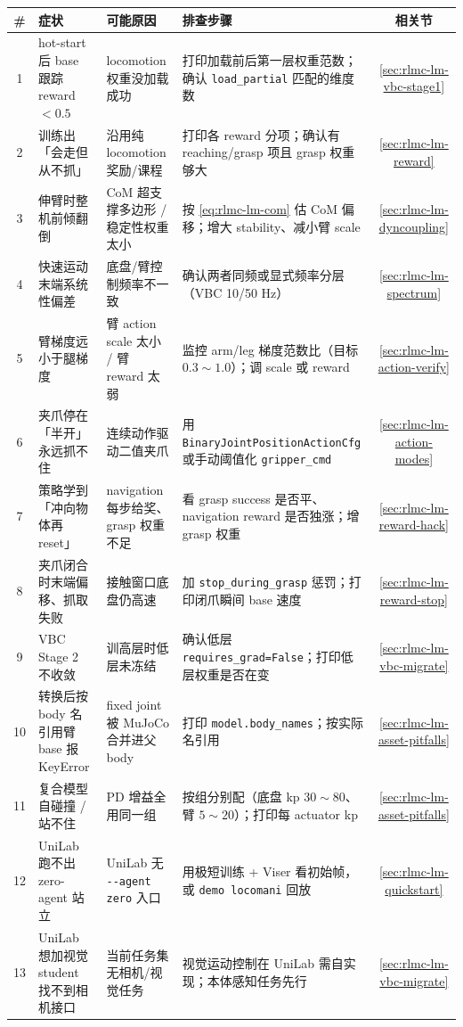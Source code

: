 \begin{center}
\small
\begin{tabular}{@{}cp{3.1cm}p{3.4cm}p{4.2cm}c@{}}
\toprule
\# & 症状 & 可能原因 & 排查步骤 & 相关节 \\
\midrule
1 & hot-start 后 base 跟踪 reward $<0.5$ & locomotion 权重没加载成功 & 打印加载前后第一层权重范数；确认 \verb|load_partial| 匹配的维度数 & \cref{sec:rlmc-lm-vbc-stage1} \\
2 & 训练出「会走但从不抓」 & 沿用纯 locomotion 奖励/课程 & 打印各 reward 分项；确认有 reaching/grasp 项且 grasp 权重够大 & \cref{sec:rlmc-lm-reward} \\
3 & 伸臂时整机前倾翻倒 & CoM 超支撑多边形 / 稳定性权重太小 & 按 \eqref{eq:rlmc-lm-com} 估 CoM 偏移；增大 stability、减小臂 scale & \cref{sec:rlmc-lm-dyncoupling} \\
4 & 快速运动末端系统性偏差 & 底盘/臂控制频率不一致 & 确认两者同频或显式频率分层（VBC 10/50 Hz）& \cref{sec:rlmc-lm-spectrum} \\
5 & 臂梯度远小于腿梯度 & 臂 action scale 太小 / 臂 reward 太弱 & 监控 arm/leg 梯度范数比（目标 $0.3\!\sim\!1.0$）；调 scale 或 reward & \cref{sec:rlmc-lm-action-verify} \\
6 & 夹爪停在「半开」永远抓不住 & 连续动作驱动二值夹爪 & 用 \verb|BinaryJointPositionActionCfg| 或手动阈值化 \verb|gripper_cmd| & \cref{sec:rlmc-lm-action-modes} \\
7 & 策略学到「冲向物体再 reset」 & navigation 每步给奖、grasp 权重不足 & 看 grasp success 是否平、navigation reward 是否独涨；增 grasp 权重 & \cref{sec:rlmc-lm-reward-hack} \\
8 & 夹爪闭合时末端偏移、抓取失败 & 接触窗口底盘仍高速 & 加 \verb|stop_during_grasp| 惩罚；打印闭爪瞬间 base 速度 & \cref{sec:rlmc-lm-reward-stop} \\
9 & VBC Stage 2 不收敛 & 训高层时低层未冻结 & 确认低层 \verb|requires_grad=False|；打印低层权重是否在变 & \cref{sec:rlmc-lm-vbc-migrate} \\
10 & 转换后按 body 名引用臂 base 报 KeyError & fixed joint 被 MuJoCo 合并进父 body & 打印 \verb|model.body_names|；按实际名引用 & \cref{sec:rlmc-lm-asset-pitfalls} \\
11 & 复合模型自碰撞 / 站不住 & PD 增益全用同一组 & 按组分别配（底盘 kp $30\!\sim\!80$、臂 $5\!\sim\!20$）；打印每 actuator kp & \cref{sec:rlmc-lm-asset-pitfalls} \\
12 & UniLab 跑不出 zero-agent 站立 & UniLab 无 \verb|--agent zero| 入口 & 用极短训练 + Viser 看初始帧，或 \verb|demo locomani| 回放 & \cref{sec:rlmc-lm-quickstart} \\
13 & UniLab 想加视觉 student 找不到相机接口 & 当前任务集无相机/视觉任务 & 视觉运动控制在 UniLab 需自实现；本体感知任务先行 & \cref{sec:rlmc-lm-vbc-migrate} \\
\bottomrule
\end{tabular}
\end{center}

